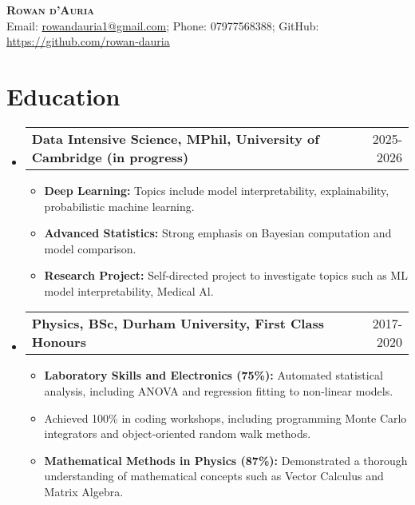 \documentclass[letterpaper,11pt]{article}
\makeatletter
\newcommand{\resumeItem}[1]{
  \item\small{
    {#1 \vspace{-2pt}}
  }
}
\newcommand{\resumeSubheading}[4]{
  \vspace{-2pt}\item
    \begin{tabular*}{0.97\textwidth}[t]{l@{\extracolsep{\fill}}r}
      \textbf{#1} & #2 \\ %
    \end{tabular*}\vspace{-7pt}
}
\newcommand{\resumeSubHeadingListStart}{\begin{itemize}[leftmargin=0.15in, label={}]}
\newcommand{\resumeSubHeadingListEnd}{\end{itemize}}
\newcommand{\resumeItemListStart}{\begin{itemize}}
\newcommand{\resumeItemListEnd}{\end{itemize}\vspace{-5pt}}
\makeatother
\begin{document}

\begin{center}
    \textbf{\Huge \scshape Rowan d'Auria} \\ \vspace{3pt}
    \small
    Email: \href{mailto:rowandauria1@gmail.com}{rowandauria1@gmail.com}; Phone: 07977568388; GitHub: \href{https://github.com/rowan-dauria}{https://github.com/rowan-dauria}
\end{center}




\section{Education}
  \vspace{3pt}
  \resumeSubHeadingListStart
    \resumeSubheading
      {Data Intensive Science, MPhil, University of Cambridge (in progress)}{2025-2026}
      {}{}
      \resumeItemListStart
        \resumeItem{\textbf{Deep Learning:} Topics include model interpretability, explainability, probabilistic machine learning.}
        \resumeItem{\textbf{Advanced Statistics:} Strong emphasis on Bayesian computation and model comparison.}
        \resumeItem{\textbf{Research Project:} Self-directed project to investigate topics such as ML model interpretability, Medical Al.}
      \resumeItemListEnd
    \resumeSubheading
      {Physics, BSc, Durham University, First Class Honours}{2017-2020}
      {}{}
      \resumeItemListStart
        \resumeItem{\textbf{Laboratory Skills and Electronics (75\%):} Automated statistical analysis, including ANOVA and regression fitting to non-linear models.}
        \resumeItem{Achieved 100\% in coding workshops, including programming Monte Carlo integrators and object-oriented random walk methods.}
        \resumeItem{\textbf{Mathematical Methods in Physics (87\%):} Demonstrated a thorough understanding of mathematical concepts such as Vector Calculus and Matrix Algebra.}
      \resumeItemListEnd
  \resumeSubHeadingListEnd


\end{document}
